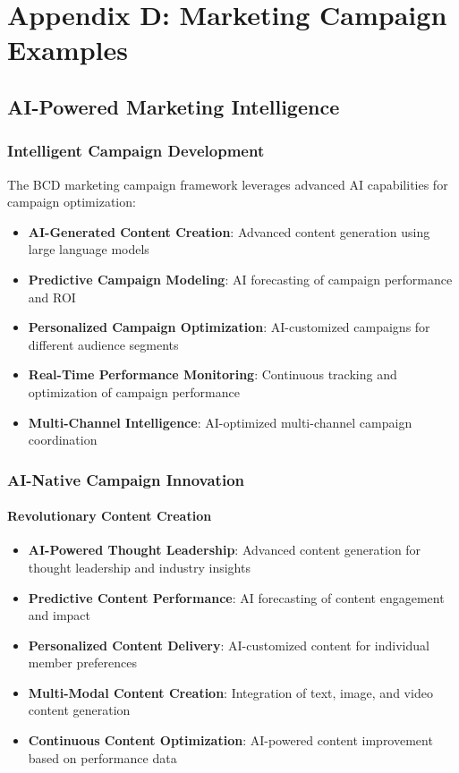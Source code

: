 \documentclass[12pt,a4paper]{book}
\begin{document}
\chapter{Appendix D: Marketing Campaign Examples}

\section{AI-Powered Marketing Intelligence}

\subsection{Intelligent Campaign Development}

The BCD marketing campaign framework leverages advanced AI capabilities for campaign optimization:

\begin{itemize}
    \item \textbf{AI-Generated Content Creation}: Advanced content generation using large language models
    \item \textbf{Predictive Campaign Modeling}: AI forecasting of campaign performance and ROI
    \item \textbf{Personalized Campaign Optimization}: AI-customized campaigns for different audience segments
    \item \textbf{Real-Time Performance Monitoring}: Continuous tracking and optimization of campaign performance
    \item \textbf{Multi-Channel Intelligence}: AI-optimized multi-channel campaign coordination
\end{itemize}

\subsection{AI-Native Campaign Innovation}

\subsubsection{Revolutionary Content Creation}

\begin{itemize}
    \item \textbf{AI-Powered Thought Leadership}: Advanced content generation for thought leadership and industry insights
    \item \textbf{Predictive Content Performance}: AI forecasting of content engagement and impact
    \item \textbf{Personalized Content Delivery}: AI-customized content for individual member preferences
    \item \textbf{Multi-Modal Content Creation}: Integration of text, image, and video content generation
    \item \textbf{Continuous Content Optimization}: AI-powered content improvement based on performance data
\end{itemize}
\end{document}
